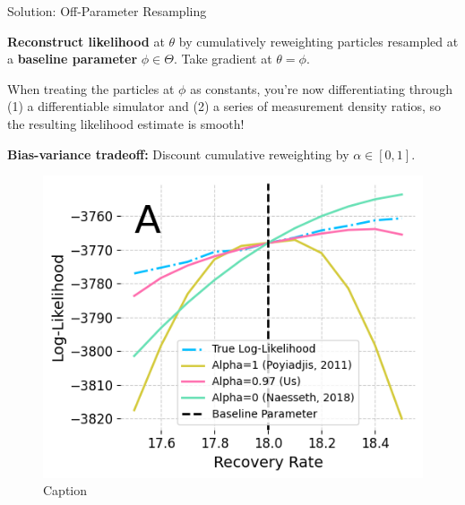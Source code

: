 \documentclass[final]{beamer}
\newlength{\colwidth}
\begin{document}
\begin{frame}[t]
\begin{columns}[t]
\begin{column}{\colwidth}
  \begin{alertblock}{Solution: Off-Parameter Resampling}

    \textbf{Reconstruct likelihood} at $\theta$ by cumulatively reweighting particles resampled at a \textbf{baseline parameter} $\phi \in \Theta$. Take gradient at $\theta=\phi$.

    When treating the particles at $\phi$ as constants, you're now differentiating through (1) a differentiable simulator and (2) a series of measurement density ratios, so the resulting likelihood estimate is smooth!

    \textbf{Bias-variance tradeoff:} Discount cumulative reweighting by $\alpha \in [0,1]$.

    \begin{figure}
        \centering
        \includegraphics[width=0.5\linewidth]{imgs/095/mop.png}
        \caption{Caption}
        \label{fig:enter-label}
    \end{figure}
  \end{alertblock}

    

\end{column}
\end{columns}
\end{frame}
\end{document}
